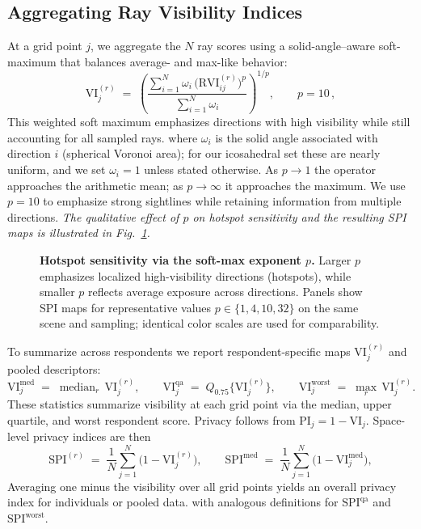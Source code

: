 \documentclass[final,3p,times,review]{elsarticle}
\begin{document}
\subsection{Aggregating Ray Visibility Indices}
\label{sec:aggregation}
At a grid point $j$, we aggregate the $N$ ray scores using a solid-angle–aware soft-maximum that balances average- and max-like behavior:
\begin{equation}
\mathrm{VI}_j^{(r)} \;=\; \left(
\frac{\sum_{i=1}^{N} \omega_i \,\big(\mathrm{RVI}^{(r)}_{ij}\big)^{p}}
     {\sum_{i=1}^{N} \omega_i}
\right)^{\!1/p}, \qquad p=10\,,
\label{eq:softmax-weighted}
\end{equation}
This weighted soft maximum emphasizes directions with high visibility while still accounting for all sampled rays.
where $\omega_i$ is the solid angle associated with direction $i$ (spherical Voronoi area); for our icosahedral set these are nearly uniform, and we set $\omega_i{=}1$ unless stated otherwise. As $p\!\to\!1$ the operator approaches the arithmetic mean; as $p\!\to\!\infty$ it approaches the maximum. We use $p{=}10$ to emphasize strong sightlines while retaining information from multiple directions.
\textit{The qualitative effect of $p$ on hotspot sensitivity and the resulting SPI maps is illustrated in Fig.~\ref{fig:softmax}.}

\begin{figure}[t]
  \centering
  \caption{\textbf{Hotspot sensitivity via the soft-max exponent $p$.} Larger $p$ emphasizes localized high-visibility directions (hotspots), while smaller $p$ reflects average exposure across directions. Panels show SPI maps for representative values $p\in\{1,4,10,32\}$ on the same scene and sampling; identical color scales are used for comparability.}
  \label{fig:softmax}
\end{figure}

To summarize across respondents we report respondent-specific maps $\mathrm{VI}_j^{(r)}$ and pooled descriptors:
\begin{equation}
\mathrm{VI}_j^{\mathrm{med}} \;=\; \operatorname{median}_{r}\,\mathrm{VI}_j^{(r)},\qquad
\mathrm{VI}_j^{\mathrm{qa}} \;=\; Q_{0.75}\{\mathrm{VI}_j^{(r)}\},\qquad
\mathrm{VI}_j^{\mathrm{worst}} \;=\; \max_{r}\,\mathrm{VI}_j^{(r)}.
\label{eq:acrossrespondents}
\end{equation}
These statistics summarize visibility at each grid point via the median, upper quartile, and worst respondent score.
Privacy follows from $\mathrm{PI}_j = 1 - \mathrm{VI}_j$. Space-level privacy indices are then
\begin{equation}
\mathrm{SPI}^{(r)} \;=\; \frac{1}{N}\sum_{j=1}^{N}\!\big(1-\mathrm{VI}_j^{(r)}\big),\qquad
\mathrm{SPI}^{\mathrm{med}} \;=\; \frac{1}{N}\sum_{j=1}^{N}\!\big(1-\mathrm{VI}_j^{\mathrm{med}}\big),
\label{eq:spi_respondent_pooled}
\end{equation}
Averaging one minus the visibility over all grid points yields an overall privacy index for individuals or pooled data.
with analogous definitions for $\mathrm{SPI}^{\mathrm{qa}}$ and $\mathrm{SPI}^{\mathrm{worst}}$.
\end{document}
